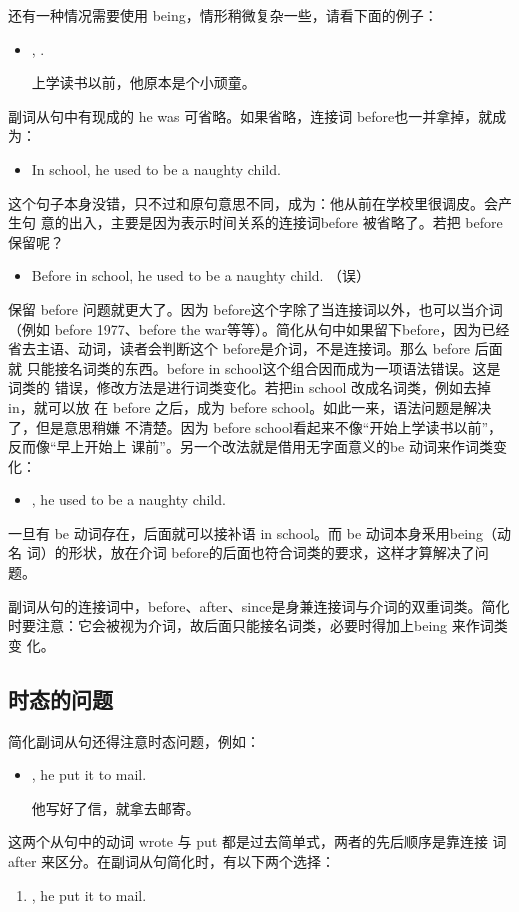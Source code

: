 还有一种情况需要使用 being，情形稍微复杂一些，请看下面的例子：
\begin{itemize}
\item {},   .

  上学读书以前，他原本是个小顽童。
\end{itemize}
副词从句中有现成的 he was 可省略。如果省略，连接词 before也一并拿掉，就成为：
\begin{itemize}
\item In school, he used to be a naughty child.
\end{itemize}
这个句子本身没错，只不过和原句意思不同，成为：他从前在学校里很调皮。会产生句
意的出入，主要是因为表示时间关系的连接词before 被省略了。若把 before 保留呢？
\begin{itemize}
\item Before in school, he used to be a naughty child. （误）
\end{itemize}
保留 before 问题就更大了。因为 before这个字除了当连接词以外，也可以当介词
（例如 before 1977、before the war等等）。简化从句中如果留下before，因为已经
省去主语、动词，读者会判断这个 before是介词，不是连接词。那么 before 后面就
只能接名词类的东西。before in school这个组合因而成为一项语法错误。这是词类的
错误，修改方法是进行词类变化。若把in school 改成名词类，例如去掉 in，就可以放
在 before 之后，成为 before school。如此一来，语法问题是解决了，但是意思稍嫌
不清楚。因为 before school看起来不像“开始上学读书以前”，反而像“早上开始上
课前”。另一个改法就是借用无字面意义的be 动词来作词类变化：
\begin{itemize}
\item {}, he used to be a naughty child.
\end{itemize}
一旦有 be 动词存在，后面就可以接补语 in school。而 be 动词本身釆用being（动名
词）的形状，放在介词 before的后面也符合词类的要求，这样才算解决了问题。

副词从句的连接词中，before、after、since是身兼连接词与介词的双重词类。简化
时要注意：它会被视为介词，故后面只能接名词类，必要时得加上being 来作词类变
化。

\subsection{时态的问题}

简化副词从句还得注意时态问题，例如：
\begin{itemize}
\item {}, he put it to mail.

  他写好了信，就拿去邮寄。
\end{itemize}
这两个从句中的动词 wrote 与 put 都是过去简单式，两者的先后顺序是靠连接
词after 来区分。在副词从句简化时，有以下两个选择：
\begin{enumerate}
\item {}, he put it to mail.
\end{enumerate}

